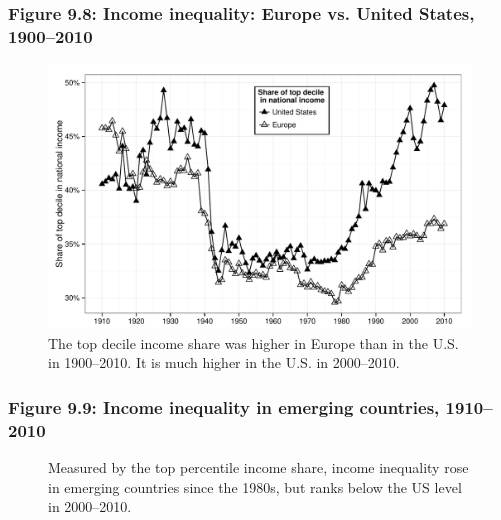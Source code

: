 \documentclass[t]{beamer}\usepackage[]{graphicx}\usepackage[]{color}
\newenvironment{knitrout}{}{} %
\begin{document}
\begin{frame}[label=Figure_9_8]
\frametitle{Figure 9.8: Income inequality: Europe vs. United States, 1900--2010}
\begin{figure}[t]
\begin{minipage}[b]{\textwidth}
\centering
\begin{knitrout}\footnotesize
{}\color{fgcolor}

{\centering \includegraphics[width=1\linewidth]{figures/bw/Figure_9_8} 

}



\end{knitrout}
\caption{The top decile income share was higher in Europe than in the U.S. in 1900--2010. It is much higher in the U.S. in 2000--2010.}
\end{minipage}
\end{figure}
\end{frame}


\begin{frame}[label=Figure_9_9]
\frametitle{Figure 9.9: Income inequality in emerging countries, 1910--2010}
\begin{figure}[t]
\begin{minipage}[b]{\textwidth}
\centering

\caption{Measured by the top percentile income share, income inequality rose in emerging countries since the 1980s, but ranks below the US level in 2000--2010.}
\end{minipage}
\end{figure}
\end{frame}
\end{document}
